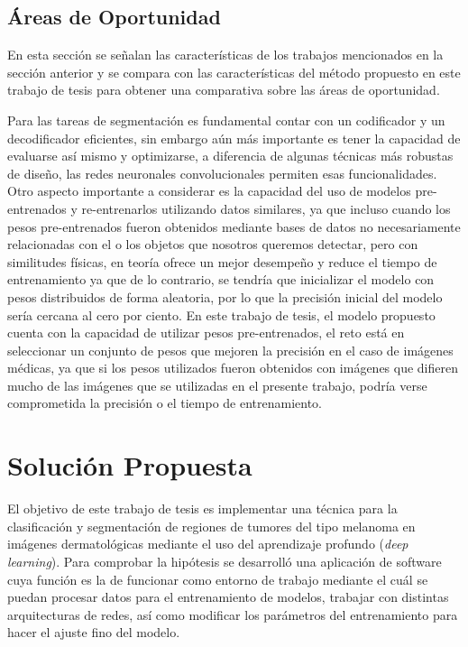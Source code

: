 \newpage

\section{Áreas de Oportunidad}
En esta sección se señalan las características de los trabajos mencionados en la sección anterior y se compara con las características del método propuesto en este trabajo de tesis para obtener una comparativa sobre las áreas de oportunidad.

Para las tareas de segmentación es fundamental contar con un codificador y un decodificador eficientes, sin embargo aún más importante es tener la capacidad de evaluarse así mismo y optimizarse, a diferencia de algunas técnicas más robustas de diseño, las redes neuronales convolucionales permiten esas funcionalidades. Otro aspecto importante a considerar es la capacidad del uso de modelos pre-entrenados y re-entrenarlos utilizando datos similares, ya que incluso cuando los pesos pre-entrenados fueron obtenidos mediante bases de datos no necesariamente relacionadas con el o los objetos que nosotros queremos detectar, pero con similitudes físicas, en teoría ofrece un mejor desempeño y reduce el tiempo de entrenamiento ya que de lo contrario, se tendría que inicializar el modelo con pesos distribuidos de forma aleatoria, por lo que la precisión inicial del modelo sería cercana al cero por ciento. En este trabajo de tesis, el modelo propuesto cuenta con la capacidad de utilizar pesos pre-entrenados, el reto está en seleccionar un conjunto de pesos que mejoren la precisión en el caso de imágenes médicas, ya que si los pesos utilizados fueron obtenidos con imágenes que difieren mucho de las imágenes que se utilizadas en el presente trabajo, podría verse comprometida la precisión o el tiempo de entrenamiento.

\chapter{Solución Propuesta}
El objetivo de este trabajo de tesis es implementar una técnica para la clasificación y segmentación de regiones de tumores del tipo melanoma en imágenes dermatológicas mediante el uso del aprendizaje profundo (\emph{deep learning}). Para comprobar la hipótesis se desarrolló una aplicación de software cuya función es la de funcionar como entorno de trabajo mediante el cuál se puedan procesar datos para el entrenamiento de modelos, trabajar con distintas arquitecturas de redes, así como modificar los parámetros del entrenamiento para hacer el ajuste fino del modelo.

